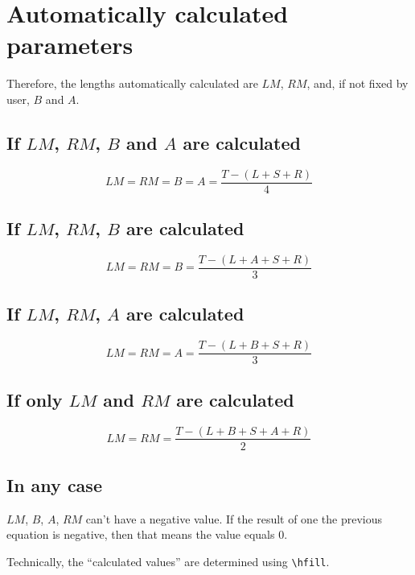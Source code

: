 \documentclass[11pt,a4paper]{article}
\begin{document}
\section{Automatically calculated parameters}
Therefore, the lengths automatically calculated are $LM$, $RM$, and, if not fixed by user, $B$ and $A$. 


\subsection{If $LM$, $RM$, $B$ and $A$ are calculated}
\begin{equation}
	LM = RM = B = A = \frac{T - (L + S + R)}{4}
\end{equation}

\subsection{If $LM$, $RM$, $B$ are calculated}

\begin{equation}
	LM = RM = B = \frac{T - (L + A + S + R)}{3}
\end{equation}

\subsection{If $LM$, $RM$, $A$ are calculated}

\begin{equation}
	LM = RM = A = \frac{T - (L + B + S + R)}{3}
\end{equation}
\subsection{If only $LM$ and $RM$ are calculated}

\begin{equation}
	LM = RM = \frac{T - (L + B + S + A + R)}{2}
\end{equation}

\subsection{In any case}
$LM$, $B$, $A$, $RM$ can't have a negative value. If the result of one the previous equation is negative, then that means the value equals $0$.

Technically, the \enquote{calculated values} are determined using \verb+\hfill+.
\end{document}
